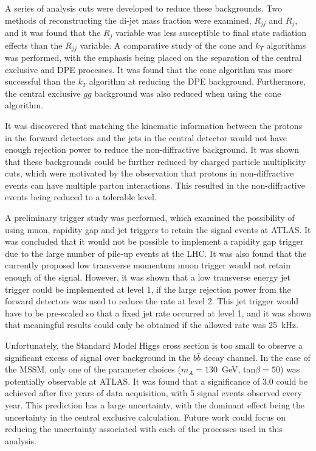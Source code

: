 A series of analysis cuts were developed to reduce these backgrounds. Two methods of reconstructing the di-jet mass fraction were examined, $R_{jj}$ and $R_{j}$, and it was found that the $R_j$ variable was less susceptible to final state radiation effects than the $R_{jj}$ variable.
A comparative study of the cone and $k_T$ algorithms was performed, with the emphasis being placed on the separation of the central exclusive and DPE processes. It was found that the cone algorithm was more successful than the $k_T$ algorithm at reducing the DPE background. Furthermore, the central exclusive $gg$ background was also reduced when using the cone algorithm.

It was discovered that matching the kinematic information between the protons in the forward detectors and the jets  in the central detector would not have enough rejection power to reduce the non-diffractive background.
It was shown that these backgrounds could be further reduced by charged particle multiplicity cuts,  which were motivated by the observation that protons in non-diffractive events can have multiple parton interactions. 
This resulted in the non-diffractive events being reduced to a tolerable level.

A preliminary trigger study was performed, which examined the possibility of using muon, rapidity gap and jet triggers to retain the signal events at ATLAS. It was concluded that it would not be possible to implement a rapidity gap trigger due to the large number of pile-up events at the LHC.
It was also found that the currently proposed low transverse momentum muon trigger would not retain enough of the signal. However, it was shown that a low transverse energy jet trigger could be implemented at level 1, if the large rejection power from the forward detectors was used to reduce the rate at level 2. This jet trigger would have to be pre-scaled so that a fixed jet rate occurred at level 1, and it was shown that meaningful results could only be obtained if the allowed rate was 25~kHz.

Unfortunately, the Standard Model Higgs cross section is too small to observe a significant excess of signal over background in the $b\bar{b}$ decay channel. In the case of the MSSM, only one of the parameter choices ($m_A=130$~GeV, tan$\beta=50$) was potentially observable at ATLAS. It was found that a significance of 3.0 could be achieved after five years of data acquisition, with 5 signal events observed every year.
This prediction has a large uncertainty, with the dominant effect being the uncertainty in the central exclusive calculation. Future work could focus on reducing the uncertainty associated with each of the processes used in this analysis.




